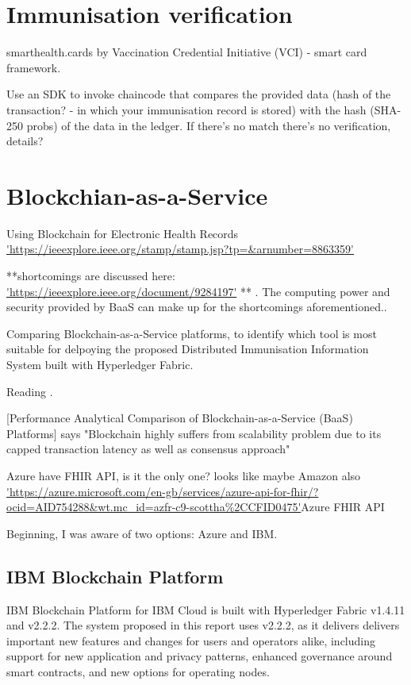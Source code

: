 \documentclass{report}
\begin{document}
\begin{flushleft}
\chapter{Immunisation verification}
smarthealth.cards by Vaccination Credential Initiative (VCI) - smart card framework.\linebreak[1]

Use an SDK to invoke chaincode that compares the provided data (hash of the transaction? - in which your immunisation record is stored) with the hash (SHA-250 probs) of the data in the ledger. If there's no match there's no verification, details?

\chapter{Blockchian-as-a-Service}

Using Blockchain for Electronic Health Records \url{'https://ieeexplore.ieee.org/stamp/stamp.jsp?tp=&arnumber=8863359'} \cite{shahnaz_using_2019} 


**shortcomings are discussed here: \url{'https://ieeexplore.ieee.org/document/9284197'} \cite{brotsis_security_2020} ** . The computing power and security provided by BaaS can make up for the shortcomings aforementioned.\cite{song_research_2021}.

Comparing Blockchain-as-a-Service platforms, to identify which tool is most suitable for delpoying the proposed Distributed Immunisation Information System built with Hyperledger Fabric.\linebreak[1]

Reading \cite{onik_performance_2019}.\linebreak[1]

[Performance Analytical Comparison of Blockchain-as-a-Service (BaaS) Platforms] says "Blockchain highly suffers from scalability problem due to its capped transaction
latency as well as consensus approach"\linebreak[1]

Azure have FHIR API, is it the only one? looks like maybe Amazon also \url{'https://azure.microsoft.com/en-gb/services/azure-api-for-fhir/?ocid=AID754288&wt.mc_id=azfr-c9-scottha%2CCFID0475'}{Azure FHIR API}
\linebreak[1]

Beginning, I was aware of two options: Azure and IBM.\linebreak[1]

\section{IBM Blockchain Platform}
IBM Blockchain Platform for IBM Cloud is built with Hyperledger Fabric v1.4.11 and v2.2.2. The system proposed in this report uses v2.2.2, as it delivers delivers important new features and changes for users and operators alike, including support for new application and privacy patterns, enhanced governance around smart contracts, and new options for operating nodes. \cite{noauthor_whats_nodate}


\end{flushleft}
\end{document}
